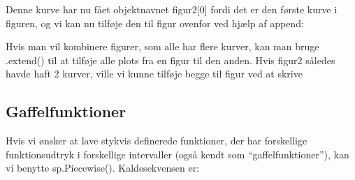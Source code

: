 \documentclass[letterpaper,10pt,english]{jupyterBook}
\begin{document}
\begin{sphinxVerbatim}[commandchars=\\\{\}]
  

             
\end{sphinxVerbatim}

\noindent{}

Denne kurve har nu fået objektnavnet figur2{[}0{]} fordi det er den første kurve i figuren, og vi kan nu tilføje den til figur ovenfor ved hjælp af append:

\begin{sphinxVerbatim}[commandchars=\\\{\}]
\PYG{p}{[}\PYG{p}{]}
\end{sphinxVerbatim}

\noindent{}

Hvis man vil kombinere figurer, som alle har flere kurver, kan man bruge .extend() til at tilføje alle plots fra en figur til den anden. Hvis figur2 således havde haft 2 kurver, ville vi kunne tilføje begge  til figur ved at skrive

\begin{sphinxVerbatim}[commandchars=\\\{\}]
\end{sphinxVerbatim}


\subsection{Gaffelfunktioner}
\label{\detokenize{notebooks/sympy/Notebook3_plot:gaffelfunktioner}}
Hvis vi ønsker at lave stykvis definerede funktioner, der har forskellige funktionsudtryk i forskellige intervaller (også kendt som “gaffelfunktioner”), kan vi benytte sp.Piecewise(). Kaldesekvensen er:
\end{document}
